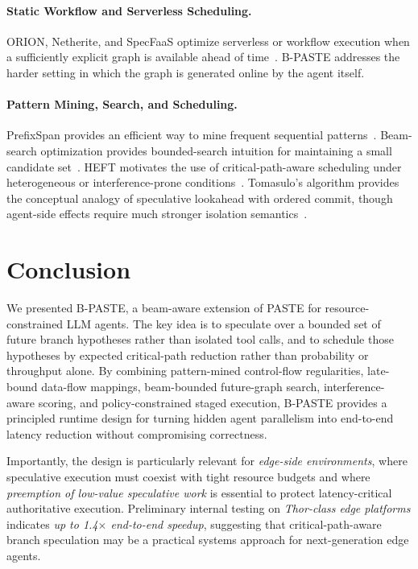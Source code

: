\documentclass[10pt,twocolumn]{article}
\begin{document}
\paragraph{Static Workflow and Serverless Scheduling.}
ORION, Netherite, and SpecFaaS optimize serverless or workflow execution when a sufficiently explicit graph is available ahead of time~\cite{orion,netherite,specfaas}. B-PASTE addresses the harder setting in which the graph is generated online by the agent itself.

\paragraph{Pattern Mining, Search, and Scheduling.}
PrefixSpan provides an efficient way to mine frequent sequential patterns~\cite{prefixspan}. Beam-search optimization provides bounded-search intuition for maintaining a small candidate set~\cite{beamsearch}. HEFT motivates the use of critical-path-aware scheduling under heterogeneous or interference-prone conditions~\cite{heft}. Tomasulo's algorithm provides the conceptual analogy of speculative lookahead with ordered commit, though agent-side effects require much stronger isolation semantics~\cite{tomasulo}.

\section{Conclusion}

We presented B-PASTE, a beam-aware extension of PASTE for resource-constrained LLM agents. The key idea is to speculate over a bounded set of future branch hypotheses rather than isolated tool calls, and to schedule those hypotheses by expected critical-path reduction rather than probability or throughput alone. By combining pattern-mined control-flow regularities, late-bound data-flow mappings, beam-bounded future-graph search, interference-aware scoring, and policy-constrained staged execution, B-PASTE provides a principled runtime design for turning hidden agent parallelism into end-to-end latency reduction without compromising correctness.

Importantly, the design is particularly relevant for \emph{edge-side environments}, where speculative execution must coexist with tight resource budgets and where \emph{preemption of low-value speculative work} is essential to protect latency-critical authoritative execution. %
Preliminary internal testing on \emph{Thor-class edge platforms} indicates \emph{up to 1.4$\times$ end-to-end speedup}, suggesting that critical-path-aware branch speculation may be a practical systems approach for next-generation edge agents.
\end{document}
